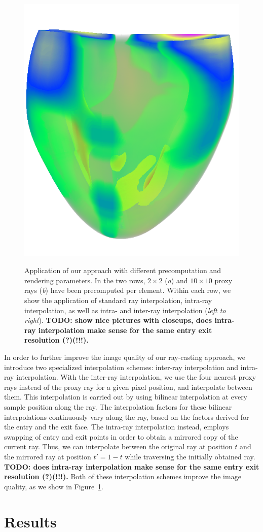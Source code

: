 \documentclass[review,journal]{vgtc}         %
\begin{document}
\begin{figure}[b]
{    \includegraphics[width=0.3\linewidth]{figures/heart-10-rr-ii.png}}
    \caption{Application of our approach with different precomputation and rendering parameters. In the two rows, $2 \times 2$ ({\it a}) and $10 \times 10$ proxy rays ({\it b}) have been precomputed per element. Within each row, we show the application of standard ray interpolation, intra-ray interpolation, as well as intra- and inter-ray interpolation ({\it left to right}). \textbf{TODO: show nice pictures with closeups, does intra-ray interpolation make sense for the same entry exit resolution (?)(!!!).}}
    \label{fig:rayinterpolation}
\end{figure}

In order to further improve the image quality of our ray-casting approach, we introduce two specialized interpolation schemes: inter-ray interpolation and intra-ray interpolation. With the inter-ray interpolation, we use the four nearest proxy rays  instead of the proxy ray for a given pixel position, and interpolate between them. This interpolation is carried out by using bilinear interpolation at every sample position along the ray. The interpolation factors for these bilinear interpolations continuously vary along the ray, based on the factors derived for the entry and the exit face. The intra-ray interpolation instead, employs swapping of entry and exit points in order to obtain a mirrored copy of the current ray. Thus, we can interpolate between the original ray at position $t$ and the mirrored ray at position $t'=1-t$ while traversing the initially obtained ray. \textbf{TODO: does intra-ray interpolation make sense for the same entry exit resolution (?)(!!!).} Both of these interpolation schemes improve the image quality, as we show in Figure~\ref{fig:rayinterpolation}.



\section{Results}\label{sec:results}
\end{document}
